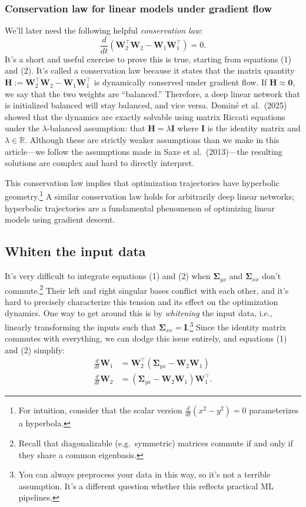 \documentclass[12pt]{article}
\newcommand{\vzero}{\mathbf{0}}
\newcommand{\mW}{\mathbf{W}}
\newcommand{\mH}{\mathbf{H}}
\newcommand{\mI}{\mathbf{I}}
\newcommand{\mSigma}{\boldsymbol{\Sigma}}
\begin{document}
\subsubsection*{Conservation law for linear models under gradient flow}

We'll later need the following helpful \emph{conservation law}:
\begin{equation}
    \frac{d}{dt}(\mW_2^\top \mW_2 - \mW_1 \mW_1^\top) = 0.
\end{equation}
It's a short and useful exercise to prove this is true, starting from equations (1) and (2). It's called a conservation law because it states that the matrix quantity $\mH := \mW_2^\top \mW_2 - \mW_1 \mW_1^\top$ is dynamically conserved under gradient flow. If $\mH\approx\vzero$, we say that the two weights are ``balanced.'' Therefore, a deep linear network that is initialized balanced will stay balanced, and vice versa. Domin\'{e} et al.\ (2025) showed that the dynamics are exactly solvable using matrix Riccati equations under the $\lambda$-balanced assumption: that $\mH = \lambda \mI$ where $\mI$ is the identity matrix and $\lambda \in \mathbb{R}$. Although these are strictly weaker assumptions than we make in this article---we follow the assumptions made in Saxe et al.\ (2013)---the resulting solutions are complex and hard to directly interpret.

This conservation law implies that optimization trajectories have hyperbolic geometry.\footnote{For intuition, consider that the scalar version $\frac{d}{dt}(x^2-y^2)=0$ parameterizes a hyperbola.} A similar conservation law holds for arbitrarily deep linear networks; hyperbolic trajectories are a fundamental phenomenon of optimizing linear models using gradient descent.

\subsection{Whiten the input data}

It's very difficult to integrate equations (1) and (2) when $\mSigma_{yx}$ and $\mSigma_{xx}$ don't commute.\footnote{Recall that diagonalizable (e.g.\ symmetric) matrices commute if and only if they share a common eigenbasis.} Their left and right singular bases conflict with each other, and it's hard to precisely characterize this tension and its effect on the optimization dynamics. One way to get around this is by \emph{whitening} the input data, i.e., linearly transforming the inputs such that $\mSigma_{xx} = \mI$.\footnote{You can always preprocess your data in this way, so it's not a terrible assumption. It's a different question whether this reflects practical ML pipelines.} Since the identity matrix commutes with everything, we can dodge this issue entirely, and equations (1) and (2) simplify:
\begin{align}
    \frac{d}{dt}\mW_1 &= \mW_2^\top(\mSigma_{yx} - \mW_2 \mW_1)\\
    \frac{d}{dt}\mW_2 &= (\mSigma_{yx} - \mW_2 \mW_1) \mW_1^\top.
\end{align}
\end{document}
